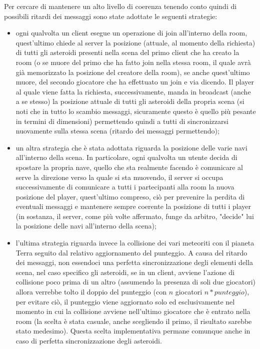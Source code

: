 \documentclass[paper=a4, fontsize=11pt]{scrartcl} %
\numberwithin{equation}{section} %
\numberwithin{figure}{section} %
\numberwithin{table}{section} %
\begin{document}
\begin{itemize}
Per cercare di mantenere un alto livello di coerenza tenendo conto quindi di possibili ritardi dei messaggi sono state adottate le seguenti strategie:
\begin{itemize}
\item ogni qualvolta un client esegue un operazione di join all'interno della room, quest'ultimo chiede al server la posizione (attuale, al momento della richiesta) di tutti gli asteroidi presenti nella scena del primo client che ha creato la room (o se muore del primo che ha fatto join nella stessa room, il quale avrà già memorizzato la posizione del creatore della room), se anche quest'ultimo muore, del secondo giocatore che ha effettuato un join e via dicendo. Il player al quale viene fatta la richiesta, successivamente, manda in broadcast (anche a se stesso) la posizione attuale di tutti gli asteroidi della propria scena (si noti che in tutto lo scambio messaggi, sicuramente questo è quello più pesante in termini di dimensioni) permettendo quindi a tutti di sincronizzarsi nuovamente sulla stessa scena (ritardo dei messaggi permettendo);
\item un altra strategia che è stata adottata riguarda la posizione delle varie navi all'interno della scena. In particolare, ogni qualvolta un utente decida di spostare la propria nave, quello che sta realmente facendo è comunicare al serve la direzione verso la quale si sta muovendo, il server si occupa successivamente di comunicare a tutti i partecipanti alla room la nuova posizione del player, quest'ultimo compreso, ciò per prevenire la perdita di eventuali messaggi e mantenere sempre coerente la posizione di tutti i player (in sostanza, il server, come più volte affermato, funge da arbitro, "decide" lui la posizione delle navi all'interno della scena);
\item l'ultima strategia riguarda invece la collisione dei vari meteoriti con il pianeta Terra seguito dal relativo aggiornamento del punteggio. A causa del ritardo dei messaggi, non essendoci una perfetta sincronizzazione degli elementi della scena, nel caso specifico gli asteroidi, se in un client, avviene l'azione di collisione poco prima di un altro (assumendo la presenza di soli due giocatori) allora verrebbe tolto il doppio del punteggio (con $n$ giocatori $n*punteggio$), per evitare ciò, il punteggio viene aggiornato solo ed esclusivamente nel momento in cui la collisione avviene nell'ultimo giocatore che è entrato nella room (la scelta è stata casuale, anche scegliendo il primo, il risultato sarebbe stato medesimo). Questa scelta implementativa permane comunque anche in caso di perfetta sincronizzazione degli asteroidi.
\end{itemize}


\end{itemize}
\end{document}
